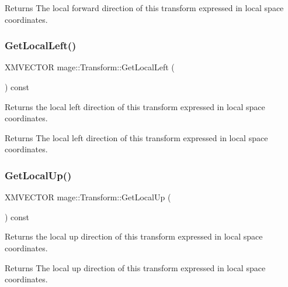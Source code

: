 \begin{DoxyReturn}{Returns}
The local forward direction of this transform expressed in local space coordinates. 
\end{DoxyReturn}
\hypertarget{structmage_1_1_transform_a5f8a16cfb69024d9d361a9255c57e44c}{}\label{structmage_1_1_transform_a5f8a16cfb69024d9d361a9255c57e44c} 
\subsubsection{\texorpdfstring{Get\+Local\+Left()}{GetLocalLeft()}}
{\footnotesize\ttfamily X\+M\+V\+E\+C\+T\+OR mage\+::\+Transform\+::\+Get\+Local\+Left (\begin{DoxyParamCaption}{ }\end{DoxyParamCaption}) const}

Returns the local left direction of this transform expressed in local space coordinates.

\begin{DoxyReturn}{Returns}
The local left direction of this transform expressed in local space coordinates. 
\end{DoxyReturn}
\hypertarget{structmage_1_1_transform_a1f799786b8b8500504ca7cf2ecbea21a}{}\label{structmage_1_1_transform_a1f799786b8b8500504ca7cf2ecbea21a} 
\subsubsection{\texorpdfstring{Get\+Local\+Up()}{GetLocalUp()}}
{\footnotesize\ttfamily X\+M\+V\+E\+C\+T\+OR mage\+::\+Transform\+::\+Get\+Local\+Up (\begin{DoxyParamCaption}{ }\end{DoxyParamCaption}) const}

Returns the local up direction of this transform expressed in local space coordinates.

\begin{DoxyReturn}{Returns}
The local up direction of this transform expressed in local space coordinates. 
\end{DoxyReturn}
\hypertarget{structmage_1_1_transform_a6fe97738bf9ae9d1e677c3e09b8c6d81}{}\label{structmage_1_1_transform_a6fe97738bf9ae9d1e677c3e09b8c6d81} 
